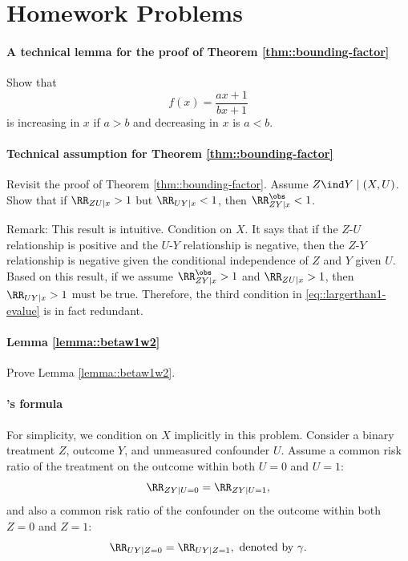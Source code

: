 \section{Homework Problems}


\paragraph{A technical lemma for the proof of Theorem \ref{thm::bounding-factor}}
\label{hw::technical-for-evalue-increasing}

Show that 
$$
f(x) = \frac{ax+1}{bx+1}
$$
is increasing in $x$ if $a>b$ and decreasing in $x$ is $a<b$. 


\paragraph{Technical assumption for Theorem \ref{thm::bounding-factor}}
\label{hw::technical-largerthan1}

Revisit the proof of Theorem \ref{thm::bounding-factor}. Assume $Z\ind Y \mid (X, U)$. Show that if $ \RR_{ZU\mid x} > 1$ but $ \RR_{UY\mid x} < 1$, then $\RR_{ZY\mid x}^\obs < 1$. 


Remark: 
This result is intuitive. Condition on $X.$ It says that if the $Z$-$U$ relationship is positive and the $U$-$Y$ relationship is negative, then the $Z$-$Y$ relationship is negative given the conditional independence of $Z$ and $Y$ given $U$. 
Based on this result, if we assume $\RR_{ZY\mid x}^\obs > 1$ and $ \RR_{ZU\mid x} > 1$, then $ \RR_{UY\mid x} > 1$ must be true. 
Therefore, the third condition in \eqref{eq::largerthan1-evalue} is in fact redundant. 



\paragraph{Lemma \ref{lemma::betaw1w2}}\label{hw::proof-lemma-evalue}

Prove Lemma \ref{lemma::betaw1w2}.

\paragraph{\citet{Schlesselman::1978}'s formula}\label{hw::Schlesselman1978formula}

For simplicity, we condition on $X$ implicitly in this problem. 
Consider a binary treatment $Z$, outcome $Y$, and unmeasured confounder $U$.
Assume a common risk ratio of the treatment on the outcome within both $U=0$ and $U=1$:
$$
 \RR_{ZY|U=0} = \RR_{ZY|U=1}, 
$$
and also a common risk ratio of the confounder on the outcome within both $Z=0$ and $Z=1$:
$$  
\RR_{UY|Z=0} = \RR_{UY|Z=1} , \text{ denoted by }\gamma.
$$

